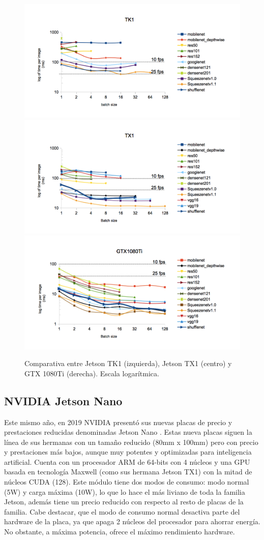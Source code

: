 \begin{figure}[htp]
    \centering
    \captionsetup{justification=centering}
    \includegraphics[width=.33\textwidth]{img/TK1_log.png}\hfill
    \includegraphics[width=.33\textwidth]{img/TX1_log.png}\hfill
    \includegraphics[width=.33\textwidth]{img/gtx1080_log.png}
    \caption{Comparativa entre Jetson TK1 (izquierda), Jetson TX1 (centro) y GTX 1080Ti (derecha). Escala logarítmica.}
    \label{fig:ben_tk1_comp_1080}
\end{figure}

\subsection{NVIDIA Jetson Nano}
\label{sec:jnano}

Este mismo año, en 2019 NVIDIA presentó sus nuevas placas de precio y prestaciones reducidas denominadas Jetson Nano \cite{jetsonnano}. Estas nueva placas siguen la línea de sus hermanas con un tamaño reducido (80mm x 100mm) pero con precio y prestaciones más bajos, aunque muy potentes y optimizadas para inteligencia artificial. Cuenta con un procesador ARM de 64-bits con 4 núcleos y una GPU basada en tecnología Maxwell (como sus hermana Jetson TX1) con la mitad de núcleos CUDA (128). Este módulo tiene dos modos de consumo: modo normal (5W) y carga máxima (10W), lo que lo hace el más liviano de toda la familia Jetson, además tiene un precio reducido con respecto al resto de placas de la familia. Cabe destacar, que el modo de consumo normal desactiva parte del hardware de la placa, ya que apaga 2 núcleos del procesador para ahorrar energía. No obstante, a máxima potencia, ofrece el máximo rendimiento hardware.

